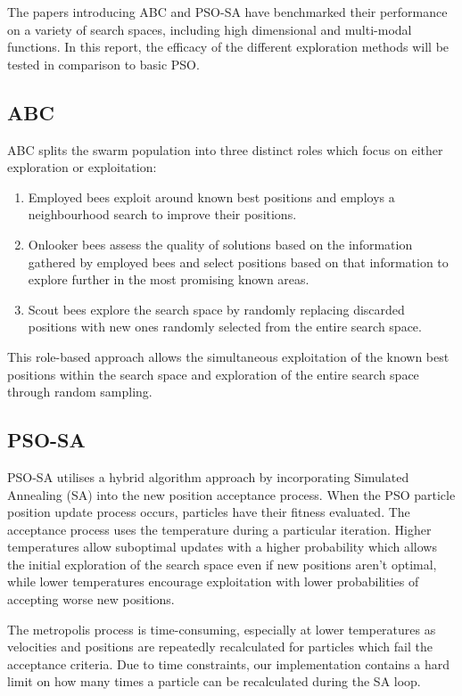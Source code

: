 \documentclass[a4paper, 12pt]{extarticle}
\begin{document}
The papers introducing ABC and PSO-SA have benchmarked their performance on a variety of search spaces, including high dimensional and multi-modal functions. In this report, the efficacy of the different exploration methods will be tested in comparison to basic  PSO. 

\subsection{ABC} 
ABC splits the swarm population into three distinct roles which focus on either exploration or exploitation: 

\begin{enumerate}
    \item Employed bees exploit around known best positions and employs a neighbourhood search to improve their positions. 
    \item Onlooker bees assess the quality of solutions based on the information gathered by employed bees and select positions based on that information to explore further in the most promising known areas.
    \item Scout bees explore the search space by randomly replacing discarded positions with new ones randomly selected from the entire search space. 
\end{enumerate}

This role-based approach allows the simultaneous exploitation of the known best positions within the search space and exploration of the entire search space through random sampling. 

\subsection{PSO-SA} 
PSO-SA utilises a hybrid algorithm approach by incorporating Simulated Annealing (SA) into the new position acceptance process. When the PSO particle position update process occurs, particles have their fitness evaluated. The acceptance process uses the temperature during a particular iteration. Higher temperatures allow suboptimal updates with a higher probability which allows the initial exploration of the search space even if new positions aren't optimal, while lower temperatures encourage exploitation with lower probabilities of accepting worse new positions.   

The metropolis process is time-consuming, especially at lower temperatures as velocities and positions are repeatedly recalculated for particles which fail the acceptance criteria. Due to time constraints, our implementation contains a hard limit on how many times a particle can be recalculated during the SA loop. 
\end{document}
